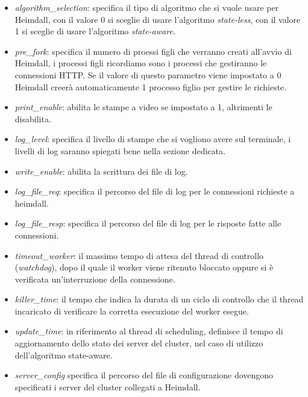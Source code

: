 \documentclass[italian]{tktltiki2}
\begin{document}
\begin{itemize}
	\item \emph{algorithm\_selection}: specifica il tipo di algoritmo che si vuole usare per Heimdall, con il valore 0 si sceglie di usare l'algoritmo \emph{state-less}, con il valore 1 si sceglie di usare l'algoritmo \emph{state-aware}.

	\item \emph{pre\_fork}: specifica il numero di proessi figli che verranno creati all'avvio di Heimdall, i processi figli ricordiamo sono i processi che gestiranno le connessioni HTTP. Se il valore di questo parametro viene impostato a 0 Heimdall creerà automaticamente 1 processo figlio per gestire le richieste.
	
	\item \emph{print\_enable}: abilita le stampe a video se impostato a 1, altrimenti le disabilita.
		
	\item \emph{log\_level}: specifica il livello di stampe che si vogliono avere sul terminale, i livelli di log saranno spiegati bene nella sezione dedicata.
	
	\item \emph{write\_enable}: abilita la scrittura dei file di log.
 	
	\item \emph{log\_file\_req}: specifica il percorso del file di log per le connessioni richieste a heimdall.
		
	\item \emph{log\_file\_resp}: specifica il percorso del file di log per le risposte fatte alle connessioni.
		
	\item \emph{timeout\_worker}: il massimo tempo di attesa del thread di controllo (\emph{watchdog}), dopo il quale il worker viene ritenuto bloccato oppure si è verificata un'interruzione della connessione.
	
	\item \emph{killer\_time}: il tempo che indica la durata di un ciclo di controllo che il thread incaricato di verificare la corretta esecuzione del worker esegue.
	
	\item \emph{update\_time}: in riferimento al thread di scheduling, definisce il tempo di aggiornamento dello stato dei server del cluster, nel caso di utilizzo dell'algoritmo state-aware. 
	
	\item \emph{server\_config} specifica il percorso del file di configurazione dovengono specificati i server del cluster collegati a Heimdall.
	

\end{itemize}
\end{document}
